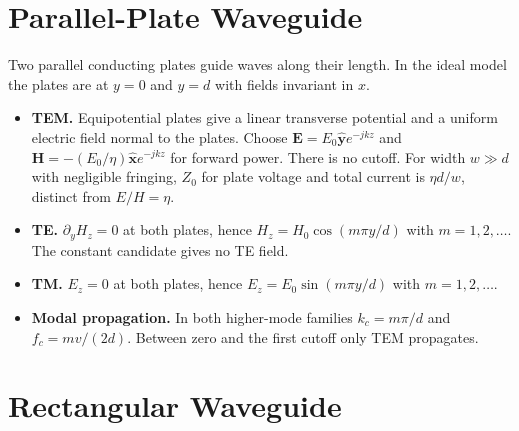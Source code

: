\documentclass[12pt,a4paper]{article}
\begin{document}
\section{Parallel-Plate Waveguide}
\begin{tcolorbox}[defbox,title={Parallel-plate waveguide}]
Two parallel conducting plates guide waves along their length. In the ideal model the plates are at $y=0$ and $y=d$ with fields invariant in $x$.
\end{tcolorbox}
\begin{itemize}[leftmargin=*,itemsep=3pt]
\item \textbf{TEM.} Equipotential plates give a linear transverse potential and a uniform electric field normal to the plates. Choose $\mathbf E=E_0\hat{\mathbf y}e^{-jkz}$ and $\mathbf H=-(E_0/\eta)\hat{\mathbf x}e^{-jkz}$ for forward power. There is no cutoff. For width $w\gg d$ with negligible fringing, $Z_0$ for plate voltage and total current is $\eta d/w$, distinct from $E/H=\eta$.
\item \textbf{TE.} $\partial_y H_z=0$ at both plates, hence $H_z=H_0\cos(m\pi y/d)$ with $m=1,2,\ldots$. The constant candidate gives no TE field.
\item \textbf{TM.} $E_z=0$ at both plates, hence $E_z=E_0\sin(m\pi y/d)$ with $m=1,2,\ldots$.
\item \textbf{Modal propagation.} In both higher-mode families $k_c=m\pi/d$ and $f_c=mv/(2d)$. Between zero and the first cutoff only TEM propagates.
\end{itemize}
\begin{tcolorbox}[tikzbox,title={Parallel plates carrying a TEM wave},unbreakable]
\centering
{}
\end{tcolorbox}

\section{Rectangular Waveguide}
\end{document}

